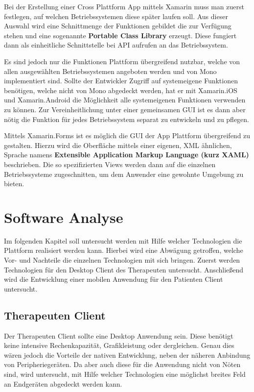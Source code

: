 Bei der Erstellung einer Cross Plattform App mittels Xamarin muss man zuerst festlegen, auf welchen Betriebssystemen diese später laufen soll. Aus dieser Auswahl wird eine Schnittmenge der Funktionen gebildet die zur Verfügung stehen und eine sogenannte \textbf{Portable Class Library} erzeugt. Diese fungiert dann als einheitliche Schnittstelle bei API aufrufen an das Betriebssystem.

Es sind jedoch nur die Funktionen Plattform übergreifend nutzbar, welche von allen ausgewählten Betriebssystemen angeboten werden und von Mono implementiert sind. 
Sollte der Entwickler Zugriff auf systemeigene Funktionen benötigen, welche nicht von Mono abgedeckt werden, hat er mit Xamarin.iOS und Xamarin.Android die Möglichkeit alle systemeigenen Funktionen verwenden zu können. Zur Vereinheitlichung unter einer gemeinsamen GUI ist es dann aber nötig die Funktion für jedes Betriebssystem separat zu entwickeln und zu pflegen.

Mittels Xamarin.Forms ist es möglich die GUI der App Plattform übergreifend zu gestalten. Hierzu wird die Oberfläche mittels einer eigenen, XML ähnlichen, Sprache namens \textbf{Extensible Application Markup Language (kurz XAML)} beschrieben. Die so spezifizierten Views werden dann auf die einzelnen Betriebssysteme zugeschnitten, um dem Anwender eine gewohnte Umgebung zu bieten. 

\section{Software Analyse}
Im folgenden Kapitel soll untersucht werden mit Hilfe welcher Technologien die Plattform realisiert werden kann. Hierbei wird eine Abwägung getroffen, welche Vor- und Nachteile die einzelnen Technologien mit sich bringen. Zuerst werden Technologien für den Desktop Client des Therapeuten untersucht. Anschließend wird die Entwicklung einer mobilen Anwendung für den Patienten Client untersucht.

\subsection{Therapeuten Client}
Der Therapeuten Client sollte eine Desktop Anwendung sein. Diese benötigt keine intensive Rechenkapazität, Grafikleistung oder dergleichen.
Genau dies wären jedoch die Vorteile der nativen Entwicklung, neben der näheren Anbindung von Peripheriegeräten. Da aber auch diese für die Anwendung nicht von Nöten sind, wird untersucht, mit Hilfe welcher Technologien eine möglichst breites Feld an Endgeräten abgedeckt werden kann.

